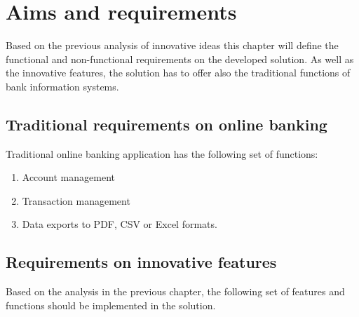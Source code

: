 \chapter {Aims and requirements}
Based on the previous analysis of innovative ideas this chapter will define the functional and non-functional requirements on the developed solution. As well as the innovative features, the solution has to offer also the traditional functions of bank information systems.

\section{Traditional requirements on online banking}
Traditional online banking application has the following set of functions:

\begin{enumerate}
	\item Account management
	\item Transaction management
	\item Data exports to PDF, CSV or Excel formats.
\end{enumerate}

\section{Requirements on innovative features}
Based on the analysis in the previous chapter, the following set of features and functions should be implemented in the solution.

